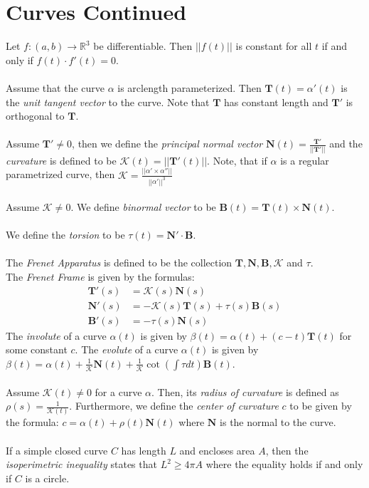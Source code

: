 \documentclass{article}
\begin{document}
    \section*{Curves Continued}
    Let $f:(a,b)\to\mathbb{R}^3$ be differentiable. Then $||f(t)||$ is constant for all $t$ if and only if $f(t)\cdot f'(t)=0$.\\\\
    Assume that the curve $\alpha$ is arclength parameterized. Then $\mathbf{T}(t) = \alpha'(t)$ is the 
    \textit{unit tangent vector} to the curve. Note that $\mathbf{T}$ has constant length and $\mathbf{T}'$ 
    is orthogonal to $\mathbf{T}$.\\\\
    Assume $\mathbf{T}'\neq 0$, then we define the \textit{principal normal vector} $\mathbf{N}(t) = 
    \frac{\mathbf{T}'}{||\mathbf{T}'||}$ and the \textit{curvature} is defined to be $\mathcal{K}(t) = ||\mathbf{T}'(t)||$. Note,
    that if $\alpha$ is a regular parametrized curve, then $\mathcal{K} = \frac{||\alpha'\times \alpha''||}{||\alpha'||^3}$\\\\
    Assume $\mathcal{K}\neq 0$. We define \textit{binormal vector} to be $\mathbf{B}(t) = \mathbf{T}(t)\times \mathbf{N}(t)$.\\\\
    We define the \textit{torsion} to be $\tau(t) = \mathbf{N}'\cdot \mathbf{B}$.\\\\
    The \textit{Frenet Apparatus} is defined to be the collection $\mathbf{T},\mathbf{N},\mathbf{B},\mathcal{K}$ and $\tau$.\\
    The \textit{Frenet Frame} is given by the formulas:
    \begin{align*}
        \mathbf{T}'(s) &= \mathcal{K}(s)\mathbf{N}(s) \\
        \mathbf{N}'(s) &= -\mathcal{K}(s)\mathbf{T}(s) + \tau(s)\mathbf{B}(s)\\
        \mathbf{B}'(s) &= -\tau(s)\mathbf{N}(s)
    \end{align*}
    The \textit{involute} of a curve $\alpha(t)$ is given by $\beta(t) = \alpha(t) + (c-t)\mathbf{T}(t)$ for some constant $c$.
    The \textit{evolute} of a curve $\alpha(t)$ is given by $\beta(t) = \alpha(t) + 
    \frac{1}{\mathcal{K}}\mathbf{N}(t) + \frac{1}{\mathcal{K}}\cot(\int\tau dt)\mathbf{B}(t)$.\\\\
    Assume $\mathcal{K}(t)\neq 0$ for a curve $\alpha$. Then, its \textit{radius of curvature} is defined as $\rho(s) = 
    \frac{1}{\mathcal{K}(t)}$. Furthermore, we define the \textit{center of curvature} $c$ to be given by the formula:
    $c = \alpha(t) + \rho(t)\mathbf{N}(t)$ where $\mathbf{N}$ is the normal to the curve.\\\\
    If a simple closed curve $C$ has length $L$ and encloses area $A$, then the \textit{isoperimetric inequality} states that
    $L^2 \geq 4\pi A$ where the equality holds if and only if $C$ is a circle.
\end{document}
